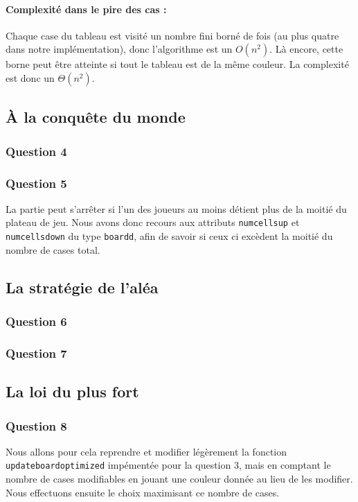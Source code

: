 \documentclass[12pt,a4paper,twoside]{article}
\begin{document}
\paragraph*{Complexité dans le pire des cas :}
\label{sec:orgheadline7}
Chaque case du tableau est visité un nombre fini borné de fois (au
plus quatre dans notre implémentation), donc l'algorithme est un
\(O(n^{2})\). 
Là encore, cette borne peut être atteinte si tout le tableau
est de la même couleur. La complexité est donc un \(\Theta(n^{2})\).
\subsection{À la conquête du monde}
\label{sec:orgheadline12}
\subsubsection*{Question 4}
\label{sec:orgheadline10}
\subsubsection*{Question 5}
\label{sec:orgheadline11}
La partie peut s'arrêter si l'un des joueurs au moins détient plus de
la moitié du plateau de jeu. Nous avons donc recours aux attributs
\texttt{numcellsup} et \texttt{numcellsdown} du type \texttt{boardd},
afin de savoir si ceux ci excèdent la moitié du nombre de cases total.

\subsection{La stratégie de l'aléa}
\label{sec:orgheadline15}
\subsubsection*{Question 6}
\label{sec:orgheadline13}
\subsubsection*{Question 7}
\label{sec:orgheadline14}
\subsection{La loi du plus fort}
\label{sec:orgheadline19}
\subsubsection*{Question 8}
\label{sec:orgheadline16}
Nous allons pour cela reprendre et modifier légèrement la fonction
\texttt{updateboardoptimized} impémentée pour la question 3, mais en
comptant le nombre de cases modifiables en jouant une couleur donnée au
lieu de les modifier. Nous effectuons ensuite le choix maximisant ce
nombre de cases.
\end{document}
